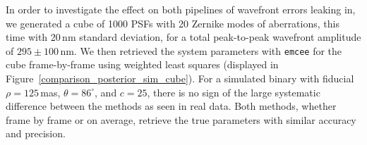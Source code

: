 \documentclass[modern]{aastex63}
\begin{document}
In order to investigate the effect on both pipelines of wavefront errors leaking in, we generated a cube of 1000 PSFs with 20 Zernike modes of aberrations, this time with 20\,nm standard deviation, for a total peak-to-peak wavefront amplitude of $295\pm 100$\,nm. We then retrieved the system parameters with \texttt{emcee} for the cube
frame-by-frame using weighted least squares (displayed in Figure~\ref{comparison_posterior_sim_cube}). For a simulated binary with fiducial $\rho = 125$\,mas, $\theta=86^\circ$, and $c = 25$, there is no sign of the large systematic difference between the methods as seen in real data. Both methods, whether frame by frame or on average, retrieve the true parameters with similar accuracy and precision. %


\end{document}
